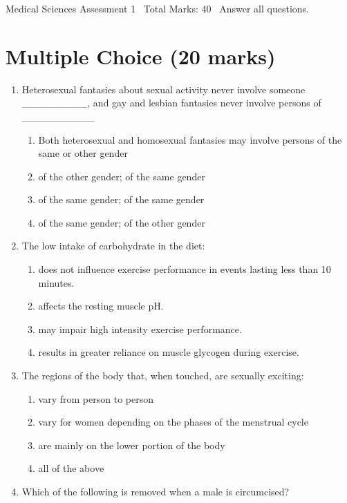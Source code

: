 \documentclass[12pt]{article}
\begin{document}
\begin{center}
Medical Sciences Assessment 1 \
Total Marks: 40 \
Answer all questions.
\end{center}

\section*{Multiple Choice (20 marks)}
\begin{enumerate}[label=\arabic*.]
\item Heterosexual fantasies about sexual activity never involve someone \_\_\_\_\_\_\_\_\_, and gay and lesbian fantasies never involve persons of \_\_\_\_\_\_\_\_\_\_
\begin{enumerate}[label=(\alph*)]
    \item Both heterosexual and homosexual fantasies may involve persons of the same or other gender
    \item of the other gender; of the same gender
    \item of the same gender; of the same gender
    \item of the same gender; of the other gender
\end{enumerate}
\item The low intake of carbohydrate in the diet:
\begin{enumerate}[label=(\alph*)]
    \item does not influence exercise performance in events lasting less than 10 minutes.
    \item affects the resting muscle pH.
    \item may impair high intensity exercise performance.
    \item results in greater reliance on muscle glycogen during exercise.
\end{enumerate}
\item The regions of the body that, when touched, are sexually exciting:
\begin{enumerate}[label=(\alph*)]
    \item vary from person to person
    \item vary for women depending on the phases of the menstrual cycle
    \item are mainly on the lower portion of the body
    \item all of the above
\end{enumerate}
\item Which of the following is removed when a male is circumcised?
\begin{enumerate}[label=(\alph*)]

\end{enumerate}
\end{enumerate}
\end{document}

